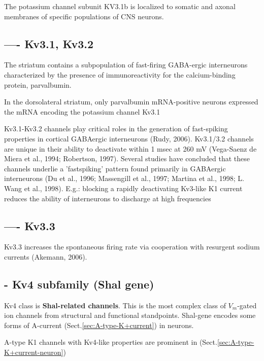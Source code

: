 The potassium channel subunit KV3.1b is localized to somatic and axonal
membranes of specific populations of CNS neurons. 

\subsection{---- Kv3.1, Kv3.2}
\label{sec:Kv3.1}
\label{sec:Kv3.2}

The striatum contains a subpopulation of fast-firing GABA-ergic interneurons
characterized by the presence of immunoreactivity for the calcium-binding
protein, parvalbumin.

In the dorsolateral striatum, only parvalbumin mRNA-positive neurons expressed
the mRNA encoding the potassium channel Kv3.1

Kv3.1-Kv3.2 channels play critical roles in the generation of fast-spiking
properties in cortical GABAergic interneurons (Rudy, 2006).
Kv3.1/3.2 channels are unique in their ability to deactivate within 1 msec at
260 mV (Vega-Saenz de Miera et al., 1994; Robertson, 1997).
Several studies have concluded that these channels underlie a 'fastspiking'
pattern found primarily in GABAergic interneurons (Du et al., 1996; Massengill
et al., 1997; Martina et al., 1998; L. Wang et al., 1998). E.g.: blocking a
rapidly deactivating Kv3-like K1 current reduces the ability of interneurons to
discharge at high frequencies

\subsection{---- Kv3.3}
\label{sec:Kv3.3}

Kv3.3 increases the spontaneous firing rate via cooperation with resurgent
sodium currents (Akemann, 2006).




\subsection{- Kv4 subfamily (Shal gene)}
\label{sec:Kv4-channels}
\label{sec:Shal-gene}

Kv4 class is {\bf Shal-related channels}. This is the most complex class of
$V_m$-gated ion channels from structural and functional standpoints.
Shal-gene encodes some forms of A-current (Sect.\ref{sec:A-type-K+current}) in
neurons.

A-type K1 channels with Kv4-like properties are prominent in
(Sect.\ref{sec:A-type-K+current-neuron})

